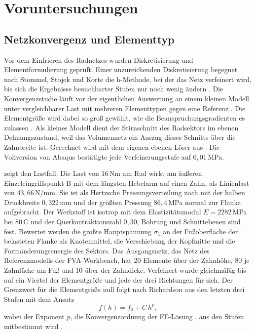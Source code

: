\chapter{Voruntersuchungen}
\label{chap:voruntersuchungen}

\section{Netzkonvergenz und Elementtyp}
\label{sec:netzkonvergenz}

Vor dem Einfrieren des Radnetzes wurden Diskretisierung und Elementformulierung geprüft. Einer unzureichenden Diskretisierung begegnet nach Stommel, Stojek und Korte die h-Methode, bei der das Netz verfeinert wird, bis sich die Ergebnisse benachbarter Stufen nur noch wenig ändern \cite[S.~424]{Sto18}. Die Konvergenzstudie läuft vor der eigentlichen Auswertung an einem kleinen Modell unter vergleichbarer Last mit mehreren Elementtypen gegen eine Referenz \cite[S.~433]{Sto18}. Die Elementgröße wird dabei so groß gewählt, wie die Beanspruchungsgradienten es zulassen \cite[S.~465]{Sto18}. Als kleines Modell dient der Stirnschnitt des Radsektors im ebenen Dehnungszustand, weil das Volumennetz ein Auszug dieses Schnitts über die Zahnbreite ist. Gerechnet wird mit dem eigenen ebenen Löser aus . Die Vollversion von Abaqus bestätigte jede Verfeinerungsstufe auf $0{,}01$\,MPa.

 zeigt den Lastfall. Die Last von $16$\,Nm am Rad wirkt am äußeren Einzeleingriffspunkt B mit dem längsten Hebelarm auf einen Zahn, als Linienlast von $43{,}66$\,N/mm. Sie ist als Hertzsche Pressungsverteilung nach \cite{Nie19} mit der halben Druckbreite $0{,}322$\,mm und der größten Pressung $86{,}4$\,MPa normal zur Flanke aufgebracht. Der Werkstoff ist isotrop mit dem Elastizitätsmodul $E = 2282$\,MPa bei $80$\,\textdegree C und der Querkontraktionszahl $0{,}30$, Bohrung und Schnittebenen sind fest. Bewertet werden die größte Hauptspannung $\sigma_{\mathrm{1}}$ an der Fußoberfläche der belasteten Flanke als Knotenmittel, die Verschiebung der Kopfmitte und die Formänderungsenergie des Sektors. Das Ausgangsnetz, das Netz des Referenzmodells der FVA-Workbench, hat 20 Elemente über der Zahnhöhe, 80 je Zahnlücke am Fuß und 10 über der Zahndicke. Verfeinert wurde gleichmäßig bis auf ein Viertel der Elementgröße und jede der drei Richtungen für sich. Der Grenzwert für die Elementgröße null folgt nach Richardson aus den letzten drei Stufen mit dem Ansatz
\begin{equation}
	f(h) = f_{\mathrm{0}} + C\,h^{p},
	\label{eq:richardson}
\end{equation}
wobei der Exponent $p$, die Konvergenzordnung der FE-Lösung \cite[S.~244]{Bat96}, aus den Stufen mitbestimmt wird \cite[S.~523]{DahReu22}.

